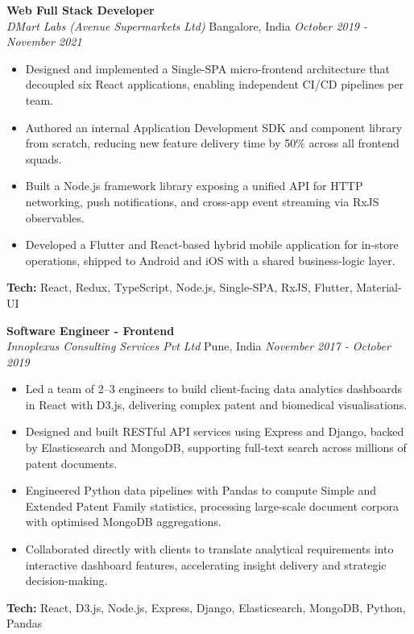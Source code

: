 \documentclass[a4paper,10pt]{article}
\begin{document}
\textbf{Web Full Stack Developer}\\
\textit{DMart Labs (Avenue Supermarkets Ltd)} \textbar{} Bangalore, India \textbar{} \textit{\small October 2019 - November 2021}\\
\begin{itemize}[leftmargin=1.5em,itemsep=0pt,parsep=0pt,topsep=0pt,partopsep=0pt]
  \item Designed and implemented a Single-SPA micro-frontend architecture that decoupled six React applications, enabling independent CI/CD pipelines per team.
  \item Authored an internal Application Development SDK and component library from scratch, reducing new feature delivery time by 50\% across all frontend squads.
  \item Built a Node.js framework library exposing a unified API for HTTP networking, push notifications, and cross-app event streaming via RxJS observables.
  \item Developed a Flutter and React-based hybrid mobile application for in-store operations, shipped to Android and iOS with a shared business-logic layer.
\end{itemize}
\noindent\textbf{\small Tech:} \small React, Redux, TypeScript, Node.js, Single-SPA, RxJS, Flutter, Material-UI
\vspace{3pt}

\textbf{Software Engineer - Frontend}\\
\textit{Innoplexus Consulting Services Pvt Ltd} \textbar{} Pune, India \textbar{} \textit{\small November 2017 - October 2019}\\
\begin{itemize}[leftmargin=1.5em,itemsep=0pt,parsep=0pt,topsep=0pt,partopsep=0pt]
  \item Led a team of 2–3 engineers to build client-facing data analytics dashboards in React with D3.js, delivering complex patent and biomedical visualisations.
  \item Designed and built RESTful API services using Express and Django, backed by Elasticsearch and MongoDB, supporting full-text search across millions of patent documents.
  \item Engineered Python data pipelines with Pandas to compute Simple and Extended Patent Family statistics, processing large-scale document corpora with optimised MongoDB aggregations.
  \item Collaborated directly with clients to translate analytical requirements into interactive dashboard features, accelerating insight delivery and strategic decision-making.
\end{itemize}
\noindent\textbf{\small Tech:} \small React, D3.js, Node.js, Express, Django, Elasticsearch, MongoDB, Python, Pandas
\vspace{3pt}
\end{document}
